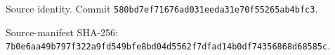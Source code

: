 \par\smallskip\begingroup\footnotesize\raggedright
\noindent Source identity. Commit \texttt{580bd7ef71676ad031eeda31e70f55265ab4bfc3}.\par
\noindent Source-manifest SHA-256:\\
\texttt{7b0e6aa49b797f322a9fd549bfe8bd04}\allowbreak\texttt{d5562f7dfad14b0df74356868d68585c}.\par\endgroup
